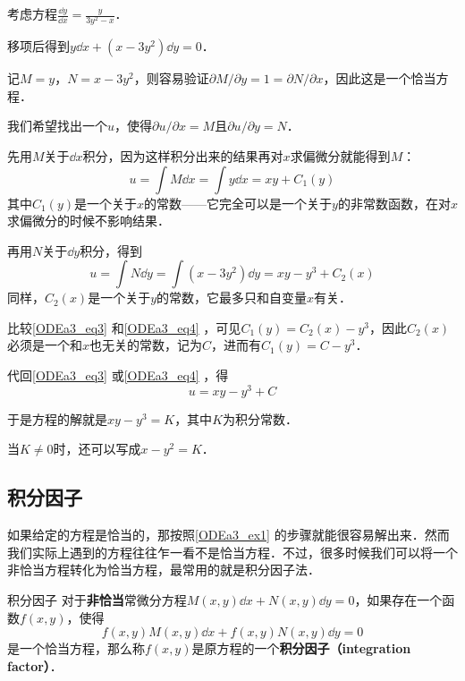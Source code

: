 \begin{example}{}\label{ODEa3_ex1}
考虑方程$\frac{\dd y}{\dd x}=\frac{y}{3y^2-x}$．

移项后得到$y\dd x+(x-3y^2)\dd y=0$．

记$M=y$，$N=x-3y^2$，则容易验证$\partial M/\partial y= 1 =\partial N/\partial x$，因此这是一个恰当方程．

我们希望找出一个$u$，使得$\partial u/\partial x=M$且$\partial u/\partial y=N$．

先用$M$关于$\dd x$积分，因为这样积分出来的结果再对$x$求偏微分就能得到$M$：
\begin{equation}\label{ODEa3_eq3}
u=\int M\dd x=\int y\dd x=xy+C_1(y)
\end{equation}
其中$C_1(y)$是一个关于$x$的常数——它完全可以是一个关于$y$的非常数函数，在对$x$求偏微分的时候不影响结果．

再用$N$关于$\dd y$积分，得到
\begin{equation}\label{ODEa3_eq4}
u=\int N\dd y=\int (x-3y^2)\dd y=xy-y^3+C_2(x)
\end{equation}
同样，$C_2(x)$是一个关于$y$的常数，它最多只和自变量$x$有关．

比较\autoref{ODEa3_eq3} 和\autoref{ODEa3_eq4} ，可见$C_1(y)=C_2(x)-y^3$，因此$C_2(x)$必须是一个和$x$也无关的常数，记为$C$，进而有$C_1(y)=C-y^3$．

代回\autoref{ODEa3_eq3} 或\autoref{ODEa3_eq4} ，得
\begin{equation}
u=xy-y^3+C
\end{equation}

于是方程的解就是$xy-y^3=K$，其中$K$为积分常数．

当$K\not=0$时，还可以写成$x-y^2=K$．

\end{example}


\subsection{积分因子}

如果给定的方程是恰当的，那按照\autoref{ODEa3_ex1} 的步骤就能很容易解出来．然而我们实际上遇到的方程往往乍一看不是恰当方程．不过，很多时候我们可以将一个非恰当方程转化为恰当方程，最常用的就是积分因子法．

\begin{definition}{积分因子}
对于\textbf{非恰当}常微分方程$M(x, y)\dd x+N(x, y)\dd y=0$，如果存在一个函数$f(x, y)$，使得
\begin{equation}\label{ODEa3_eq5}
f(x, y)M(x, y)\dd x+f(x, y)N(x, y)\dd y=0
\end{equation}
是一个恰当方程，那么称$f(x, y)$是原方程的一个\textbf{积分因子（integration factor）}．
\end{definition}


